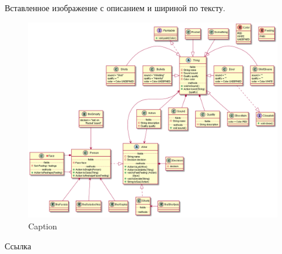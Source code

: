 Вставленное изображение с описанием и шириной по тексту.
\begin{figure}[H] %
    \centering
    \includegraphics[width=\textwidth]{res/UML-class-diagram.png}
    \caption{Caption}
    \label{fig:enter-label}
\end{figure}



Ссылка \cite{itmocompmath} %
\newpage





